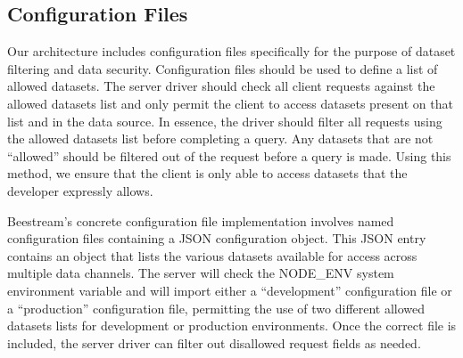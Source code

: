 \subsection{Configuration Files}
Our architecture includes configuration files specifically for the purpose of dataset filtering and data security.  Configuration files should be used to define a list of allowed datasets.  The server driver should check all client requests against the allowed datasets list and only permit the client to access datasets present on that list and in the data source.  In essence, the driver should filter all requests using the allowed datasets list before completing a query.  Any datasets that are not “allowed” should be filtered out of the request before a query is made.  Using this method, we ensure that the client is only able to access datasets that the developer expressly allows. \par
Beestream’s concrete configuration file implementation involves named configuration files containing a JSON configuration object.  This JSON entry contains an object that lists the various datasets available for access across multiple data channels.  The server will check the NODE\_ENV system environment variable and will import either a “development” configuration file or a “production” configuration file, permitting the use of two different allowed datasets lists for development or production environments.  Once the correct file is included, the server driver can filter out disallowed request fields as needed. \par

